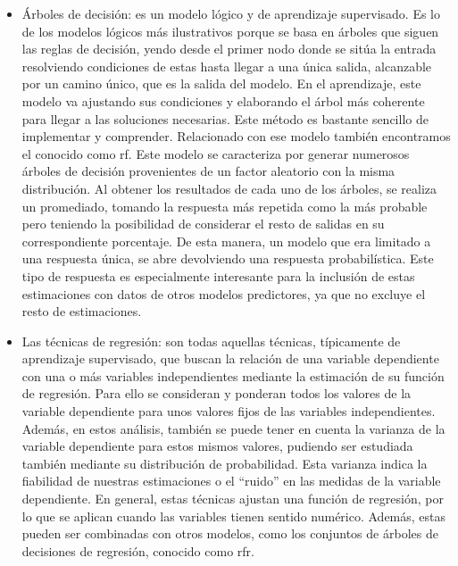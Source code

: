\begin{itemize}
	\item Árboles de decisión: es un modelo lógico y de aprendizaje supervisado. Es lo de los modelos lógicos más ilustrativos porque se basa en árboles que siguen las reglas de decisión, yendo desde el primer nodo donde se sitúa la entrada resolviendo condiciones de estas hasta llegar a una única salida, alcanzable por un camino único, que es la salida del modelo. En el aprendizaje, este modelo va ajustando sus condiciones y elaborando el árbol más coherente para llegar a las soluciones necesarias. Este método es bastante sencillo de implementar y comprender. Relacionado con ese modelo también encontramos el conocido como \gls{rf}. Este modelo se caracteriza por generar numerosos árboles de decisión provenientes de un factor aleatorio con la misma distribución. Al obtener los resultados de cada uno de los árboles, se realiza un promediado, tomando la respuesta más repetida como la más probable pero teniendo la posibilidad de considerar el resto de salidas en su correspondiente porcentaje. De esta manera, un modelo que era limitado a una respuesta única, se abre devolviendo una respuesta probabilística. Este tipo de respuesta es especialmente interesante para la inclusión de estas estimaciones con datos de otros modelos predictores, ya que no excluye el resto de estimaciones. 
	\item Las técnicas de regresión: son todas aquellas técnicas, típicamente de aprendizaje supervisado, que buscan la relación de una variable dependiente con una o más variables independientes mediante la estimación de su función de regresión. Para ello se consideran y ponderan todos los valores de la variable dependiente para unos valores fijos de las variables independientes. Además, en estos análisis, también se puede tener en cuenta la varianza de la variable dependiente para estos mismos valores, pudiendo ser estudiada también mediante su distribución de probabilidad. Esta varianza indica la fiabilidad de nuestras estimaciones o el ``ruido'' en las medidas de la variable dependiente. En general, estas técnicas ajustan una función de regresión, por lo que se aplican cuando las variables tienen sentido numérico. Además, estas pueden ser combinadas con otros modelos, como los conjuntos de árboles de decisiones de regresión, conocido como \gls{rfr}.
\end{itemize}

